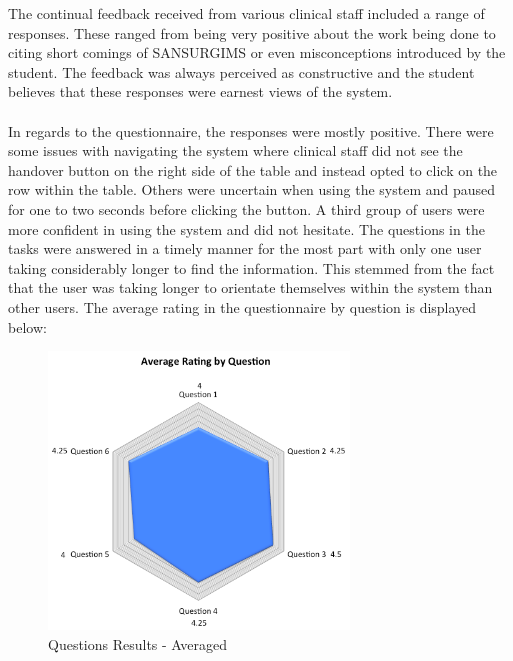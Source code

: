 The continual feedback received from various clinical staff included a range of responses. These ranged from being very positive about the work being done to citing short comings of SANSURGIMS or even misconceptions introduced by the student. The feedback was always perceived as constructive and the student believes that these responses were earnest views of the system. 
\\ \\
In regards to the questionnaire, the responses were mostly positive. There were some issues with navigating the system where clinical staff did not see the handover button on the right side of the table and instead opted to click on the row within the table. Others were uncertain when using the system and paused for one to two seconds before clicking the button. A third group of users were more confident in using the system and did not hesitate. The questions in the tasks were answered in a timely manner for the most part with only one user taking considerably longer to find the information. This stemmed from the fact that the user was taking longer to orientate themselves within the system than other users. The average rating in the questionnaire by question is displayed below:

\begin{figure}[hp]
				\centering
				\includegraphics[scale=1.0, width=80mm]{Images/Evaluation-Results}
				\caption{Questions Results - Averaged}
\end{figure}

\newpage
